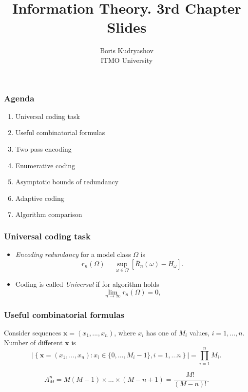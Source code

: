 \documentclass[14pt]{beamer}
\title{\small{Information Theory. 3rd Chapter Slides}}
\author{\huge{
Boris Kudryashov \\
\vspace{30pt}
ITMO University
}}
\renewcommand{\vec}[1]{\ensuremath{\boldsymbol{#1}}}
\begin{document}
\maketitle

\begin{frame}
\frametitle{Agenda}
\begin{enumerate}    
    
\item Universal coding task
\item Useful combinatorial formulas
\item Two pass encoding
\item Enumerative coding
\item Asymptotic bounds of redundancy
\item Adaptive coding
\item Algorithm comparison

\end{enumerate}
\end{frame}

\begin{frame}
\frametitle{Universal coding task}
\begin{itemize}    
    
    \item  \textit{Encoding redundancy} for a model class $\Omega$ is
    \begin{equation}
    \label{redundancy}
     r_n(\Omega ) = \mathop {\sup }\limits_{ \omega \in \Omega }
    \left[ {\bar {R}_n(\omega)- H_\omega } \right].
    \end{equation}
    
    \item Coding is called \textit{Universal} if for algorithm holds
    \[
    \lim_{n\rightarrow \infty}  r_n(\Omega ) =0,
    \]
    
\end{itemize}
\end{frame}



\begin{frame}
\frametitle{Useful combinatorial formulas}
\begin{itemize}    
\small{
    
    \item Consider sequences $\vec x = (x_1 ,...,x_n )$, where $x_i$ has one of $M_i$ values, $i = 1,...,n$. Number of different $\vec x$ is
    \begin{equation}
    \label{eq3_1} \left| {\left\{ {\vec x = (x_1 ,...,x_n ):x_i \in
    \{0,...,M_i - 1\},i = 1,...n} \right\}} \right| = \prod\limits_{i = 1}^n {M_i } .
    \end{equation}
    
    \item 
    \begin{equation}
    \label{eq3_2}
    A_M^n = M(M - 1)\times ...\times (M - n + 1)
    =\frac{M!}{(M - n)!} .
    \end{equation}
}    
\end{itemize}
\end{frame}
\end{document}

